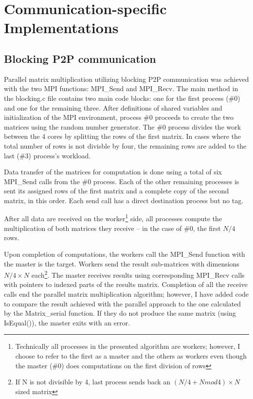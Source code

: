 \documentclass[12pt]{report}
\begin{document}
\chapter{Communication-specific Implementations}
\section{Blocking P2P communication}

Parallel matrix multiplication utilizing blocking P2P communication was achieved with the two MPI functions: MPI\_Send and MPI\_Recv. The main method in the blocking.c file contains two main code blocks: one for the first process (\#0) and one for the remaining three. After definitions of shared variables and initialization of the MPI environment, process \#0 proceeds to create the two matrices using the random number generator. The \#0 process divides the work between the 4 cores by splitting the rows of the first matrix. In cases where the total number of rows is not divisble by four, the remaining rows are added to the last (\#3) process's workload.

Data transfer of the matrices for computation is done using a total of six MPI\_Send calls from the \#0 process. Each of the other remaining processes is sent its assigned rows of the first matrix and a complete copy of the second matrix, in this order. Each send call has a direct destination process but no tag. 

After all data are received on the worker\footnote{\label{^2}Technically all processes in the presented algorithm are workers; however, I choose to refer to the first as a master and the others as workers even though the master (\#0) does computations on the first division of rows} side, all processes compute the multiplication of both matrices they receive -- in the case of \#0, the first $N/4$ rows.

Upon completion of computations, the workers call the MPI\_Send function with the master is the target. Workers send the result sub-matrices with dimensions $N/4 \times N$ each\footnote{\label{^3}If N is not divisible by 4, last process sends back an $(N/4 + N mod 4) \times N$ sized matrix}. The master receives results using corresponding MPI\_Recv calls with pointers to indexed parts of the results matrix. Completion of all the receive calls end the parallel matrix multiplication algorithm; however, I have added code to compare the result achieved with the parallel approach to the one calculated by the Matrix\_serial function. If they do not produce the same matrix (using IsEqual()), the master exits with an error.
\end{document}
